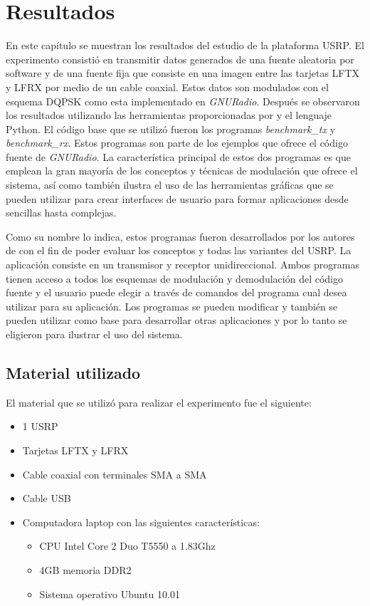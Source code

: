 \chapter{Resultados}
\label{ch:resultados}

En este cap\'itulo se muestran los resultados del estudio de la plataforma USRP. El experimento
consisti\'o en transmitir datos generados de una fuente aleatoria por software y de una fuente fija
que consiste en una imagen entre las tarjetas LFTX y LFRX por medio de un cable coaxial. Estos
datos son modulados con el esquema DQPSK como esta implementado en \emph{GNURadio}. Despu\'es se
observaron los resultados utilizando las herramientas proporcionadas por \gnuradio y el lenguaje Python. El c\'odigo base que se
utiliz\'o fueron los programas \emph{benchmark\_tx} y \emph{benchmark\_rx}. Estos programas son parte de los ejemplos que ofrece
el c\'odigo fuente de \emph{GNURadio}. La caracter\'istica principal de estos dos programas es que emplean la gran mayor\'ia de
los conceptos y t\'ecnicas de modulaci\'on que ofrece el sistema, as\'i como tambi\'en ilustra el uso de las herramientas
gr\'aficas que se pueden utilizar para crear interfaces de usuario para formar aplicaciones desde sencillas hasta complejas.

Como su nombre lo indica, estos programas fueron desarrollados por los autores de \gnuradio con el fin de poder evaluar los
conceptos y todas las variantes del USRP. La aplicaci\'on consiste en un transmisor y receptor unidireccional. Ambos programas
tienen acceso a todos los esquemas de modulaci\'on y demodulaci\'on del c\'odigo fuente y el usuario puede elegir a trav\'es de
comandos del programa cual desea utilizar para su aplicaci\'on. Los programas se pueden modificar y tambi\'en se pueden utilizar
como base para desarrollar otras aplicaciones y por lo tanto se eligieron para ilustrar el uso del sistema. 

\section{Material utilizado}
El material que se utiliz\'o para realizar el experimento fue el siguiente:

\begin{itemize}
  \item 1 USRP
  \item Tarjetas LFTX y LFRX
  \item Cable coaxial con terminales SMA a SMA
  \item Cable USB
  \item Computadora laptop con las siguientes caracter\'isticas:
  \begin {itemize}
    \item CPU Intel Core 2 Duo T5550 a 1.83Ghz
    \item 4GB memoria DDR2
    \item Sistema operativo Ubuntu 10.01
  \end{itemize}
\end{itemize}

